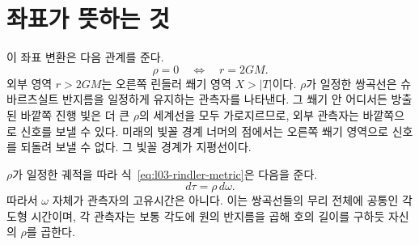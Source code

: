 \begin{classroomqa}\end{classroomqa}

\section{좌표가 뜻하는 것}

이 좌표 변환은 다음 관계를 준다.
\begin{equation}
\rho=0\quad\Longleftrightarrow\quad r=2GM.
\end{equation}
외부 영역 \(r>2GM\)는 오른쪽 린들러 쐐기 영역 \(X>|T|\)이다. \(\rho\)가 일정한 쌍곡선은 슈바르츠실트 반지름을 일정하게 유지하는 관측자를 나타낸다. 그 쐐기 안 어디서든 방출된 바깥쪽 진행 빛은 더 큰 \(\rho\)의 세계선을 모두 가로지르므로, 외부 관측자는 바깥쪽으로 신호를 보낼 수 있다. 미래의 빛꼴 경계 너머의 점에서는 오른쪽 쐐기 영역으로 신호를 되돌려 보낼 수 없다. 그 빛꼴 경계가 지평선이다.

\begin{classroomqa}\end{classroomqa}

\begin{classroomqa}\end{classroomqa}

\(\rho\)가 일정한 궤적을 따라 식~\eqref{eq:l03-rindler-metric}은 다음을 준다.
\begin{equation}
d\tau=\rho\,d\omega.
\label{eq:l03-proper-time-rindler}
\end{equation}
따라서 \(\omega\) 자체가 관측자의 고유시간은 아니다. 이는 쌍곡선들의 무리 전체에 공통인 각도형 시간이며, 각 관측자는 보통 각도에 원의 반지름을 곱해 호의 길이를 구하듯 자신의 \(\rho\)를 곱한다.

